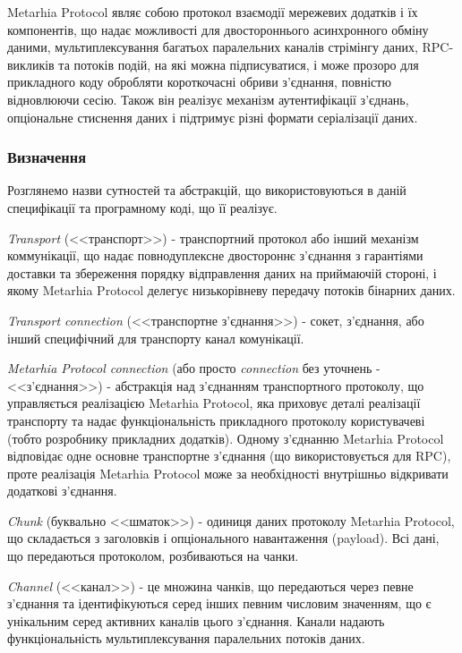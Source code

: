 Metarhia Protocol являє собою протокол взаємодії мережевих додатків і їх
компонентів, що надає можливості для двостороннього асинхронного обміну даними,
мультиплексування багатьох паралельних каналів стрімінгу даних,
\gls{RPC}-викликів та потоків подій, на які можна підписуватися, і може прозоро
для прикладного коду обробляти короткочасні обриви з'єднання, повністю
відновлюючи сесію. Також він реалізує механізм аутентифікації з'єднань,
опціональне стиснення даних і підтримує різні формати серіалізації даних.

\subsubsection{Визначення}

Розглянемо назви сутностей та абстракцій, що використовуються в даній специфікації
та програмному коді, що її реалізує.

\emph{Transport} (<<транспорт>>) - транспортний протокол або інший механізм
коммунікації, що надає повнодуплексне двостороннє з'єднання з гарантіями
доставки та збереження порядку відправлення даних на приймаючій стороні, і
якому Metarhia Protocol делегує низькорівневу передачу потоків бінарних даних.

\emph{Transport connection} (<<транспортне з'єднання>>) - сокет, з'єднання,
або інший специфічний для транспорту канал комунікації.

\emph{Metarhia Protocol connection} (або просто \emph{connection} без уточнень
- <<з'єднання>>) - абстракція над з'єднанням транспортного протоколу, що
управляється реалізацією Metarhia Protocol, яка приховує деталі реалізації
транспорту та надає функціональність прикладного протоколу користувачеві (тобто
розробнику прикладних додатків). Одному з'єднанню Metarhia Protocol відповідає
одне основне транспортне з'єднання (що використовується для \gls{RPC}), проте
реалізація Metarhia Protocol може за необхідності внутрішньо відкривати
додаткові з'єднання.

\emph{Chunk} (буквально <<шматок>>) - одиниця даних протоколу Metarhia
Protocol, що складається з заголовків і опціонального навантаження (payload).
Всі дані, що передаються протоколом, розбиваються на чанки.

\emph{Channel} (<<канал>>) - це множина чанків, що передаються через певне
з'єднання та ідентифікуються серед інших певним числовим значенням, що є
унікальним серед активних каналів цього з'єднання. Канали надають
функціональність мультиплексування паралельних потоків даних.

